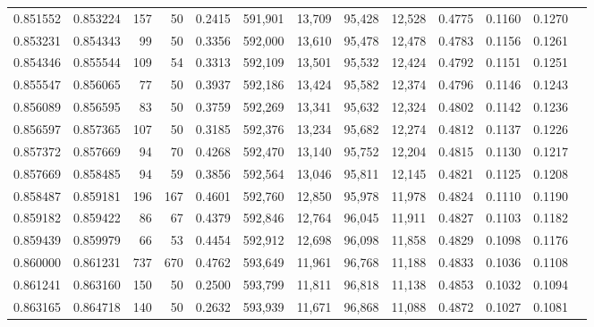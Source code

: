 \begin{tabular}{rrrrrrrrrrrrr}
0.851552 & 0.853224 &   157 &  50 &                                     0.2415 & 591,901 &  13,709 &  95,428 &  12,528 & 0.4775 & 0.1160 & 0.1270 \\
0.853231 & 0.854343 &    99 &  50 &                                     0.3356 & 592,000 &  13,610 &  95,478 &  12,478 & 0.4783 & 0.1156 & 0.1261 \\
0.854346 & 0.855544 &   109 &  54 &                                     0.3313 & 592,109 &  13,501 &  95,532 &  12,424 & 0.4792 & 0.1151 & 0.1251 \\
0.855547 & 0.856065 &    77 &  50 &                                     0.3937 & 592,186 &  13,424 &  95,582 &  12,374 & 0.4796 & 0.1146 & 0.1243 \\
0.856089 & 0.856595 &    83 &  50 &                                     0.3759 & 592,269 &  13,341 &  95,632 &  12,324 & 0.4802 & 0.1142 & 0.1236 \\
0.856597 & 0.857365 &   107 &  50 &                                     0.3185 & 592,376 &  13,234 &  95,682 &  12,274 & 0.4812 & 0.1137 & 0.1226 \\
0.857372 & 0.857669 &    94 &  70 &                                     0.4268 & 592,470 &  13,140 &  95,752 &  12,204 & 0.4815 & 0.1130 & 0.1217 \\
0.857669 & 0.858485 &    94 &  59 &                                     0.3856 & 592,564 &  13,046 &  95,811 &  12,145 & 0.4821 & 0.1125 & 0.1208 \\
0.858487 & 0.859181 &   196 & 167 &                                     0.4601 & 592,760 &  12,850 &  95,978 &  11,978 & 0.4824 & 0.1110 & 0.1190 \\
0.859182 & 0.859422 &    86 &  67 &                                     0.4379 & 592,846 &  12,764 &  96,045 &  11,911 & 0.4827 & 0.1103 & 0.1182 \\
0.859439 & 0.859979 &    66 &  53 &                                     0.4454 & 592,912 &  12,698 &  96,098 &  11,858 & 0.4829 & 0.1098 & 0.1176 \\
0.860000 & 0.861231 &   737 & 670 &                                     0.4762 & 593,649 &  11,961 &  96,768 &  11,188 & 0.4833 & 0.1036 & 0.1108 \\
0.861241 & 0.863160 &   150 &  50 &                                     0.2500 & 593,799 &  11,811 &  96,818 &  11,138 & 0.4853 & 0.1032 & 0.1094 \\
0.863165 & 0.864718 &   140 &  50 &                                     0.2632 & 593,939 &  11,671 &  96,868 &  11,088 & 0.4872 & 0.1027 & 0.1081 \\

\end{tabular}
